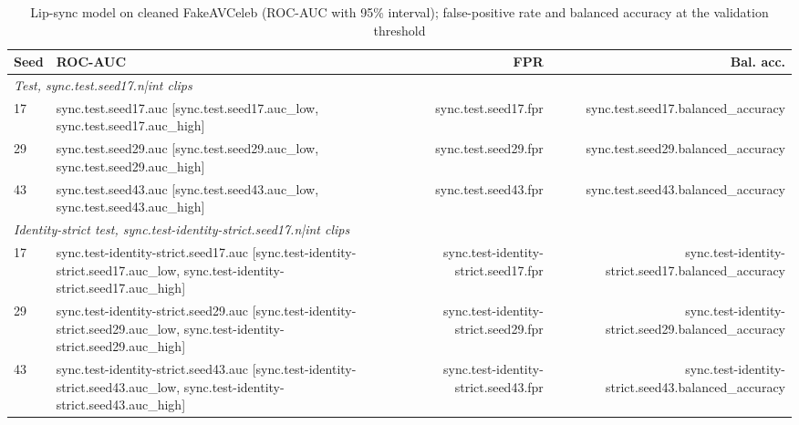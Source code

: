 \documentclass[conference]{IEEEtran}
\begin{document}
\begin{table}[htbp]
\caption{Lip-sync model on cleaned FakeAVCeleb (ROC-AUC with 95\% interval);
false-positive rate and balanced accuracy at the validation threshold}
\label{tab:sync}
\centering
\begin{tabular}{llrr}
\toprule
Seed & ROC-AUC & FPR & Bal. acc. \\
\midrule
\multicolumn{4}{l}{\textit{Test, {{sync.test.seed17.n|int}} clips}} \\
17 & {{sync.test.seed17.auc}} [{{sync.test.seed17.auc_low}}, {{sync.test.seed17.auc_high}}] & {{sync.test.seed17.fpr}} & {{sync.test.seed17.balanced_accuracy}} \\
29 & {{sync.test.seed29.auc}} [{{sync.test.seed29.auc_low}}, {{sync.test.seed29.auc_high}}] & {{sync.test.seed29.fpr}} & {{sync.test.seed29.balanced_accuracy}} \\
43 & {{sync.test.seed43.auc}} [{{sync.test.seed43.auc_low}}, {{sync.test.seed43.auc_high}}] & {{sync.test.seed43.fpr}} & {{sync.test.seed43.balanced_accuracy}} \\
\midrule
\multicolumn{4}{l}{\textit{Identity-strict test, {{sync.test-identity-strict.seed17.n|int}} clips}} \\
17 & {{sync.test-identity-strict.seed17.auc}} [{{sync.test-identity-strict.seed17.auc_low}}, {{sync.test-identity-strict.seed17.auc_high}}] & {{sync.test-identity-strict.seed17.fpr}} & {{sync.test-identity-strict.seed17.balanced_accuracy}} \\
29 & {{sync.test-identity-strict.seed29.auc}} [{{sync.test-identity-strict.seed29.auc_low}}, {{sync.test-identity-strict.seed29.auc_high}}] & {{sync.test-identity-strict.seed29.fpr}} & {{sync.test-identity-strict.seed29.balanced_accuracy}} \\
43 & {{sync.test-identity-strict.seed43.auc}} [{{sync.test-identity-strict.seed43.auc_low}}, {{sync.test-identity-strict.seed43.auc_high}}] & {{sync.test-identity-strict.seed43.fpr}} & {{sync.test-identity-strict.seed43.balanced_accuracy}} \\
\bottomrule
\end{tabular}
\end{table}
\end{document}
